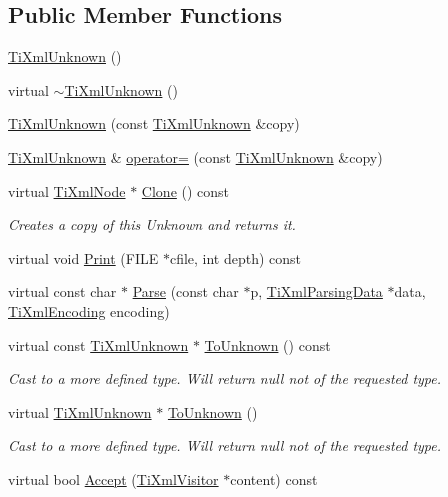 \subsection*{Public Member Functions}
\begin{DoxyCompactItemize}
\item 
\hyperlink{class_ti_xml_unknown_a945f09b3c6538099c69fc563216750c3}{Ti\+Xml\+Unknown} ()
\item 
virtual \hyperlink{class_ti_xml_unknown_ac21966c3b551553d760b4a339c9acda0}{$\sim$\+Ti\+Xml\+Unknown} ()
\item 
\hyperlink{class_ti_xml_unknown_abe798ff4feea31474850c7f0de6bdf5e}{Ti\+Xml\+Unknown} (const \hyperlink{class_ti_xml_unknown}{Ti\+Xml\+Unknown} \&copy)
\item 
\hyperlink{class_ti_xml_unknown}{Ti\+Xml\+Unknown} \& \hyperlink{class_ti_xml_unknown_a60560b5aacb4bdc8b2b5f02f0a99c5c0}{operator=} (const \hyperlink{class_ti_xml_unknown}{Ti\+Xml\+Unknown} \&copy)
\item 
virtual \hyperlink{class_ti_xml_node}{Ti\+Xml\+Node} $\ast$ \hyperlink{class_ti_xml_unknown_a675c4b2684af35e4c7649b7fd5ae598d}{Clone} () const 
\begin{DoxyCompactList}\small\item\em Creates a copy of this Unknown and returns it. \end{DoxyCompactList}\item 
virtual void \hyperlink{class_ti_xml_unknown_a025f19c21ef01ea9be50febb8fe0ba06}{Print} (F\+I\+LE $\ast$cfile, int depth) const 
\item 
virtual const char $\ast$ \hyperlink{class_ti_xml_unknown_aa51c2694e4177b5f0b5429ee5a81b58d}{Parse} (const char $\ast$p, \hyperlink{class_ti_xml_parsing_data}{Ti\+Xml\+Parsing\+Data} $\ast$data, \hyperlink{tinyxml_8h_a88d51847a13ee0f4b4d320d03d2c4d96}{Ti\+Xml\+Encoding} encoding)
\item 
virtual const \hyperlink{class_ti_xml_unknown}{Ti\+Xml\+Unknown} $\ast$ \hyperlink{class_ti_xml_unknown_ab0313e5fe77987d746ac1a97a254419d}{To\+Unknown} () const 
\begin{DoxyCompactList}\small\item\em Cast to a more defined type. Will return null not of the requested type. \end{DoxyCompactList}\item 
virtual \hyperlink{class_ti_xml_unknown}{Ti\+Xml\+Unknown} $\ast$ \hyperlink{class_ti_xml_unknown_a67c9fd22940e8c47f706a72cdd2e332c}{To\+Unknown} ()
\begin{DoxyCompactList}\small\item\em Cast to a more defined type. Will return null not of the requested type. \end{DoxyCompactList}\item 
virtual bool \hyperlink{class_ti_xml_unknown_a4e54d7482e05a837cf83c925cc683380}{Accept} (\hyperlink{class_ti_xml_visitor}{Ti\+Xml\+Visitor} $\ast$content) const 
\end{DoxyCompactItemize}
